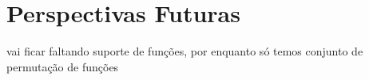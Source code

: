 \chapter{Perspectivas Futuras}\label{chp:perspectivas}

vai ficar faltando suporte de funções, por enquanto só temos conjunto de permutação de funções